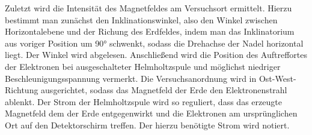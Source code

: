Zuletzt wird die Intensität des Magnetfeldes am Versuchsort ermittelt. 
Hierzu bestimmt man zunächst den Inklinationswinkel, also den Winkel zwischen Horizontalebene
und der Richung des Erdfeldes, indem man das Inklinatorium aus voriger Position um 90° schwenkt,
sodass die Drehachse der Nadel horizontal liegt. Der Winkel wird abgelesen.
Anschließend wird die Position des Auftreffortes der Elektronen bei ausgeschalteter Helmholtzspule
und möglichst niedriger Beschleunigungsspannung vermerkt. Die Versuchsanordnung wird in Ost-West-Richtung ausgerichtet,
sodass das Magnetfeld der Erde den Elektronenstrahl ablenkt. Der Strom der Helmholtzspule wird
so reguliert, dass das erzeugte Magnetfeld dem der Erde entgegenwirkt und die Elektronen
am ursprünglichen Ort auf den Detektorschirm treffen. Der hierzu benötigte Strom wird notiert.
